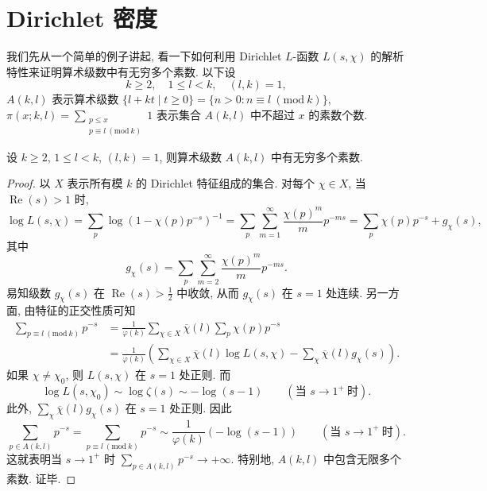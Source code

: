 \section{Dirichlet 密度}\label{sec:ch5-s1}

我们先从一个简单的例子讲起, 看一下如何利用 Dirichlet $L$-函数 $L(s,\chi)$ 的解析特性来证明算术级数中有无穷多个素数. 以下设
\[
  k\geqslant 2,\quad 1\leqslant l<k,\quad (l,k)=1,
\]
$A(k,l)$ 表示算术级数 $\{l+kt\mid t\geqslant 0\}=\{n>0:n\equiv l\ (\mathrm{mod}\ k)\}$, $\pi(x;k,l)=\sum\limits_{\substack{p\leqslant x\\ p\equiv l\ (\mathrm{mod}\ k)}}1$ 表示集合 $A(k,l)$ 中不超过 $x$ 的素数个数. 

\begin{theorem}[Dirichlet]\label{thm:5.1}
设 $k\geqslant 2$, $1\leqslant l<k$, $(l,k)=1$, 则算术级数 $A(k,l)$ 中有无穷多个素数. 
\end{theorem}

\begin{proof}
以 $X$ 表示所有模 $k$ 的 Dirichlet 特征组成的集合. 对每个 $\chi\in X$, 当 $\operatorname{Re}(s)>1$ 时, 
\[
  \log L(s,\chi)=\sum\limits_p\log(1-\chi(p)p^{-s})^{-1}
  =\sum\limits_p\sum\limits_{m=1}^{\infty}\frac{\chi(p)^m}{m}p^{-ms}
  =\sum\limits_p\chi(p)p^{-s}+g_\chi(s),
\]
其中
\[
  g_\chi(s)=\sum\limits_p\sum\limits_{m=2}^{\infty}\frac{\chi(p)^m}{m}p^{-ms}.
\]
易知级数 $g_\chi(s)$ 在 $\operatorname{Re}(s)>\frac{1}{2}$ 中收敛, 从而 $g_\chi(s)$ 在 $s=1$ 处连续. 另一方面, 由特征的正交性质可知
\begin{align*}
  \sum\limits_{p\equiv l\ (\mathrm{mod}\ k)}p^{-s}
  &=\frac{1}{\varphi(k)}\sum\limits_{\chi\in X}\overline{\chi}(l)\sum\limits_p\chi(p)p^{-s}\\
  &=\frac{1}{\varphi(k)}\left(\sum\limits_{\chi\in X}\overline{\chi}(l)\log L(s,\chi)-\sum\limits_\chi\overline{\chi}(l)g_\chi(s)\right).
\end{align*}
如果 $\chi\neq\chi_0$, 则 $L(s,\chi)$ 在 $s=1$ 处正则. 而
\[
  \log L(s,\chi_0)\sim\log\zeta(s)\sim-\log(s-1)\qquad(\text{当 } s\to1^+\ \text{时}).
\]
此外, $\sum\limits_\chi\overline{\chi}(l)g_\chi(s)$ 在 $s=1$ 处正则. 因此
\[
  \sum\limits_{p\in A(k,l)}p^{-s}=\sum\limits_{p\equiv l\ (\mathrm{mod}\ k)}p^{-s}
  \sim\frac{1}{\varphi(k)}(-\log(s-1))\qquad(\text{当 } s\to1^+\ \text{时}).
\]
这就表明当 $s\to1^+$ 时 $\sum\limits_{p\in A(k,l)}p^{-s}\to+\infty$. 特别地, $A(k,l)$ 中包含无限多个素数. 证毕. 
\end{proof}

